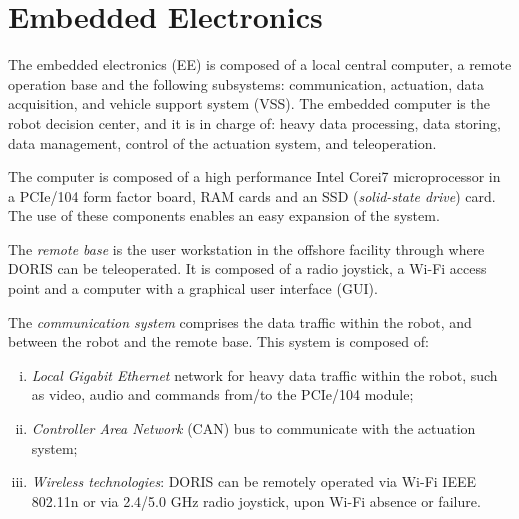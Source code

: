 \documentclass{ifacconf}
\begin{document}


\section{Embedded Electronics}\label{sec:electronics_overview}
The embedded electronics (EE) is composed of a local central computer, a remote
operation base and the following subsystems: communication, actuation, data
acquisition, and vehicle support system (VSS).
The embedded computer is the robot decision center, and it is in charge of:
heavy data processing, data storing, data management, control of the actuation
system, and teleoperation.

The computer is composed of a high performance \linebreak Intel\textregistered
Core\texttrademark i7 microprocessor in a PCIe/104 form factor board,
RAM cards and an SSD (\emph{solid-state drive}) card. The use of these
components enables an easy expansion of the system.

The \emph{remote base} is the user workstation in the offshore
facility through where DORIS can be teleoperated. It is 
composed of a radio joystick, a Wi-Fi access point and a
computer with a graphical user interface (GUI).

The \emph{communication system} comprises the data traffic within the robot, and
between the robot and the remote base. This system is composed of:

\begin{enumerate}[i)]
\item \emph{Local Gigabit Ethernet} network for heavy data traffic within the robot, such as video, audio and
commands from/to the PCIe/104 module;
\item \emph{Controller Area Network} (CAN) bus to communicate with the actuation system;
\item \emph{Wireless technologies}: DORIS can be remotely operated
via Wi-Fi IEEE 802.11n or via 2.4/5.0 GHz radio
joystick, upon Wi-Fi absence or failure.
\end{enumerate}
\end{document}
